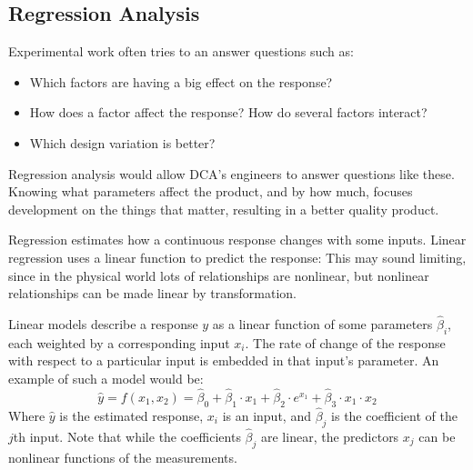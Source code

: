 \documentclass[11pt,a4paper,article]{memoir} %
\begin{document}
\subsection*{Regression Analysis}
Experimental work often tries to an answer questions such as:
\vspace{-10pt}
\begin{itemize}
\item Which factors are having a big effect on the response?
\item How does a factor affect the response? How do several factors interact?
\item Which design variation is better?
\end{itemize}
\vspace{-10pt}
 Regression analysis would allow DCA's engineers to answer questions like these. Knowing what parameters affect the product, and by how much,  focuses development on the things that matter, resulting in a better quality product.
 \par
 Regression estimates how a continuous response changes with some inputs. Linear regression uses a linear function to predict the response: This may sound limiting, since in the physical world lots of relationships are nonlinear, but nonlinear relationships can be made linear by transformation.
\par
  Linear models describe a response $y$ as a linear function of some parameters $\hat{\beta}_i$, each weighted by a corresponding input $x_i$. The rate of change of the response with respect to a particular input is embedded in that input's parameter. An example of such a model would be:
\begin{equation}
	\hat{y} = f(x_1, x_2) = \hat{\beta}_0 + \hat{\beta}_1 \cdot x_1 + \hat{\beta}_2 \cdot e^{x_1}+ \hat{\beta}_3 \cdot x_1 \cdot x_2
\end{equation}
Where $\hat{y}$ is the estimated response, $x_i$ is an input, and $\hat{\beta}_j$ is the coefficient of the $j$th input. Note that while the coefficients $\hat{\beta}_j$ are linear, the predictors $x_j$ can be nonlinear functions of the measurements.
\end{document}
